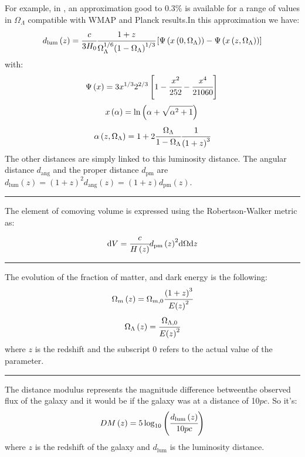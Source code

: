 For example, in \citet{WU+10}, an approximation good to 0.3\% is available for
a range of values in $\Omega_\Lambda$ compatible with WMAP and Planck
results.In this approximation we have:
%
\begin{equation}
	d_{\mathrm{lum}}\left({z}\right) = \cfrac{c}{3H_0}
    \cfrac{1+z}{\Omega_\Lambda^{1/6}
    {\left({1-\Omega_\Lambda}\right)}^{1/3}}\left[\Psi\left({x\left({0,\Omega_\Lambda}\right)}\right)-\Psi\left({x\left({z,\Omega_\Lambda}\right)}\right)\right]
\end{equation}
%
with:
%
\begin{equation}
	\Psi\left({x}\right)=3x^{1/3}{2^{2/3}}\left[1-\cfrac{x^2}{252}-\cfrac{x^4}{21060}\right]\\
\end{equation}
%
\begin{equation}
	x\left({\alpha}\right)=\ln\left({\alpha+\sqrt{\alpha^2+1}}\right)\\
\end{equation}
%
\begin{equation}
	\alpha\left({z,\Omega_\Lambda}\right) = 1+2\cfrac{\Omega_\Lambda}
    {1-\Omega_\Lambda}\cfrac{1}{{\left(1+z\right)}^3}
\end{equation}
%
The other distances are simply linked to this luminosity distance. The angular
distance $d_{\mathrm{ang}}$ and the proper distance $d_{\mathrm{pm}}$ are
$d_{\mathrm{lum}}(z)={(1+z)}^2d_{\mathrm{ang}}(z)=(1+z)d_{\mathrm{pm}}(z)$.

\noindent\rule{\linewidth}{1pt}
%
The element of comoving volume is expressed using the Robertson-Walker metric
as:
%
\begin{equation}
	{\rm{d}}{V}=\cfrac{c}{H\left({z}\right)}{d_{\mathrm{pm}}\left({z}\right)}^2{\rm{d}}{\Omega}{\rm{d}}{z}
\end{equation}

\noindent\rule{\linewidth}{1pt}
%
The evolution of the fraction of matter, and dark energy is the following:
%
\begin{equation}
	\Omega_m\left({z}\right)=\Omega_{m,0}
    \cfrac{{\left(1+z\right)}^3}{E{\left({z}\right)}^2}
\end{equation}
%
\begin{equation}
	\Omega_\Lambda\left({z}\right) =
    \cfrac{\Omega_{\Lambda,0}}{E{\left({z}\right)}^2}
\end{equation}
%
where $z$ is the redshift and the subscript 0 refers to the actual value of the
parameter.

\noindent\rule{\linewidth}{1pt}
%
The distance modulus represents the magnitude difference betweenthe observed
flux of the galaxy and it would be if the galaxy was at a distance of 10$pc$.
So it's:
%
\begin{equation}
	DM\left({z}\right)=5\log_{10}\left(\cfrac{d_{\mathrm{lum}}\left({z}\right)}{10pc}\right)%
\end{equation}
%
where $z$ is the redshift of the galaxy and $d_{\mathrm{lum}}$ is the
luminosity distance.

